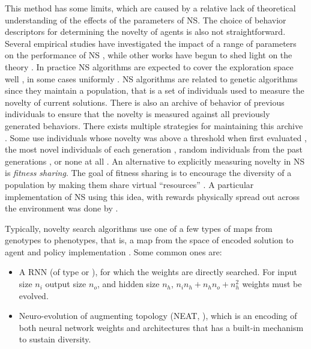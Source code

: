 This method has some limits, which are caused by a relative lack of theoretical
understanding of the effects of the parameters of \ac{NS}. The choice of
behavior descriptors for determining the novelty of agents is also not
straightforward. Several empirical studies have investigated the impact of a
range of parameters on the performance of \ac{NS}
\parencite{gomesDevisingEffectiveNovelty2015,
  kistemakerCriticalFactorsPerformance2011}, while other works have begun to
shed light on the theory \parencite{doncieuxNoveltySearchTheoretical2019}. In
practice \ac{NS} algorithms are expected to cover the exploration space well
\parencite{cullyQualityDiversityOptimization2017,pughQualityDiversityNew2016},
in some cases uniformly \parencite{gomesDevisingEffectiveNovelty2015}. \ac{NS}
algorithms are related to genetic algorithms since they maintain a population,
that is a set of individuals used to measure the novelty of current solutions.
There is also an archive of behavior of previous individuals to ensure that the
novelty is measured against all previously generated behaviors. There exists
multiple strategies for maintaining this archive
\parencite{gomesDevisingEffectiveNovelty2015}. Some use individuals whose
novelty was above a threshold when first evaluated
\parencite{lehmanAbandoningObjectivesEvolution2011}, the most novel individuals
of each generation \parencite{liapisConstrainedNoveltySearch2015}, random
individuals from the past generations
\parencite{lehmanEfficientlyEvolvingPrograms2010}, or none at all
\parencite{mouretEncouragingBehavioralDiversity2012}. An alternative to
explicitly measuring novelty in \ac{NS} is \emph{fitness sharing}. The goal of
fitness sharing is to encourage the diversity of a population by making them
share virtual ``resources'' \parencite{goldbergSimpleGeneticAlgorithms1987,
  hollandAdaptationNaturalArtificial1992}. A particular implementation of
\ac{NS} using this idea, with rewards physically spread out across the
environment was done by \textcite{herelEmergenceNoveltyEvolutionary2022}.

Typically, novelty search algorithms use one of a few types of maps from
genotypes to phenotypes, that is, a map from the space of encoded solution to
agent and policy implementation
\parencite{mouretEncouragingBehavioralDiversity2012}. Some common ones are:

\begin{itemize}
  \item A \ac{RNN} (of type \cite{elmanFindingStructureTime1990} or
        \cite{jordanSerialOrderParallel1997}), for which the weights are
        directly searched. For input size $n_{i}$ output size $n_{o}$, and
        hidden size $n_{h}$, $n_{i}n_{h} + n_{h}n_{o} + n_{h}^{2}$ weights must
        be evolved.
  \item Neuro-evolution of augmenting topology (NEAT,
        \cite{stanleyEvolvingNeuralNetworks2002}), which is an encoding of both
        neural network weights and architectures that has a built-in mechanism
        to sustain diversity.
\end{itemize}


